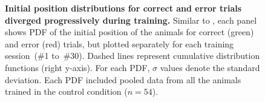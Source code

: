 \begin{figure}[!h]
  \begin{center}
    \caption[Initial Position Evolution]
    {\textbf{Initial position distributions for correct and error trials diverged progressively during training.}
    Similar to , each panel shows PDF of the initial position of the animals for correct (green) and error (red) trials, but plotted separately for each training session~(\#1 to~\#30).
    Dashed lines represent cumulative distribution functions (right y-axis).
    For each PDF, $\sigma$ values denote the standard deviation.
    Each PDF included pooled data from all the animals trained in the control condition ($n=54$).
    }
    \label{fig:appendix:initPos}
  \end{center}
\end{figure}